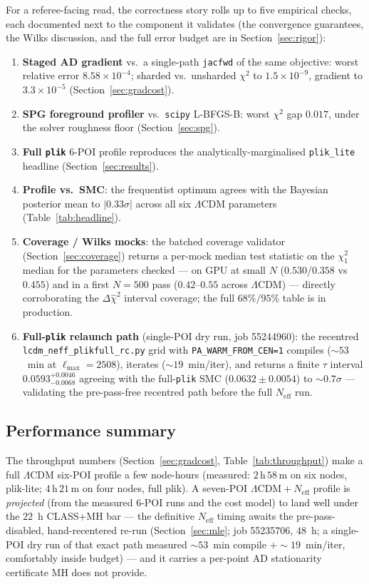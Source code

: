 \documentclass[11pt]{article}
\newcommand{\code}[1]{\texttt{\small #1}}
\newcommand{\Neff}{N_{\mathrm{eff}}}
\newcommand{\chisq}{\chi^2}
\newcommand{\dchisq}{\Delta\hat\chi^2}
\newcommand{\Lmax}{\ell_{\max}}
\begin{document}
For a referee-facing read, the correctness story rolls up to five
empirical checks, each documented next to the component it validates (the
convergence guarantees, the Wilks discussion, and the full error budget are
in Section~\ref{sec:rigor}):
\begin{enumerate}[leftmargin=2em,itemsep=1pt]
\item \textbf{Staged AD gradient} vs.\ a single-path \code{jacfwd} of the
same objective: worst relative error $8.58\times10^{-4}$; sharded vs.\
unsharded $\chisq$ to $1.5\times10^{-9}$, gradient to $3.3\times10^{-5}$
(Section~\ref{sec:gradcost}).
\item \textbf{SPG foreground profiler} vs.\ \code{scipy} L-BFGS-B: worst
$\chisq$ gap $0.017$, under the solver roughness floor
(Section~\ref{sec:spg}).
\item \textbf{Full \code{plik}} 6-POI profile reproduces the
analytically-marginalised \code{plik\_lite} headline
(Section~\ref{sec:results}).
\item \textbf{Profile vs.\ SMC}: the frequentist optimum agrees with the
Bayesian posterior mean to $|0.33\sigma|$ across all six $\Lambda$CDM
parameters (Table~\ref{tab:headline}).
\item \textbf{Coverage / Wilks mocks}: the batched coverage validator
(Section~\ref{sec:coverage}) returns a per-mock median test statistic on the
$\chisq_1$ median for the parameters checked --- on GPU at small $N$
($0.530$/$0.358$ vs $0.455$) and in a first $N{=}500$ pass ($0.42$--$0.55$
across $\Lambda$CDM) --- directly corroborating the $\dchisq$ interval
coverage; the full $68\%/95\%$ table is in production.
\item \textbf{Full-\code{plik} relaunch path} (single-POI dry run, job
55244960): the recentred \code{lcdm\_neff\_plikfull\_rc.py} grid with
\code{PA\_WARM\_FROM\_CEN=1} compiles ($\sim53$~min at $\Lmax=2508$),
iterates ($\sim19$~min/iter), and returns a finite $\tau$ interval
$0.0593^{+0.0046}_{-0.0068}$ agreeing with the full-\code{plik} SMC
($0.0632\pm0.0054$) to $\sim0.7\sigma$ --- validating the pre-pass-free
recentred path before the full $\Neff$ run.
\end{enumerate}

\subsection{Performance summary}
The throughput numbers (Section~\ref{sec:gradcost}, Table~\ref{tab:throughput})
make a full $\Lambda$CDM six-POI profile a few node-hours (measured:
$2\,\mathrm{h}\,58\,\mathrm{m}$ on six nodes, plik-lite; $4\,\mathrm{h}\,21\,\mathrm{m}$
on four nodes, full plik). A seven-POI $\Lambda\mathrm{CDM}+\Neff$ profile
is \emph{projected} (from the measured 6-POI runs and the cost model) to
land well under the $22$~h CLASS+MH bar --- the definitive $\Neff$ timing
awaits the pre-pass-disabled, hand-recentered re-run
(Section~\ref{sec:mle}; job 55235706, $48$~h; a single-POI dry run of that
exact path measured $\sim53$~min compile $+\sim19$~min/iter, comfortably
inside budget) --- and it
carries a per-point AD stationarity certificate MH does not provide.
\end{document}
